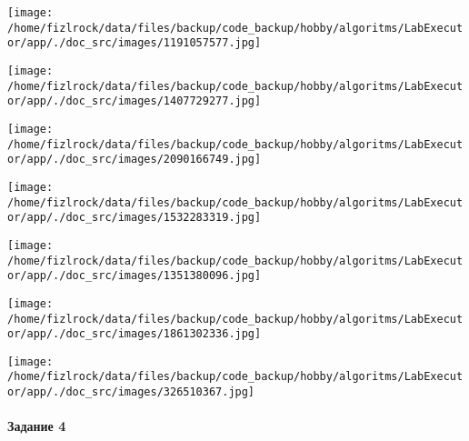 \documentclass[a4paper, 12pt]{article}
\begin{document}
\texttt{[image: /home/fizlrock/data/files/backup/code\_backup/hobby/algoritms/LabExecutor/app/./doc\_src/images/1191057577.jpg]}

\texttt{[image: /home/fizlrock/data/files/backup/code\_backup/hobby/algoritms/LabExecutor/app/./doc\_src/images/1407729277.jpg]}

\texttt{[image: /home/fizlrock/data/files/backup/code\_backup/hobby/algoritms/LabExecutor/app/./doc\_src/images/2090166749.jpg]}

\texttt{[image: /home/fizlrock/data/files/backup/code\_backup/hobby/algoritms/LabExecutor/app/./doc\_src/images/1532283319.jpg]}

\texttt{[image: /home/fizlrock/data/files/backup/code\_backup/hobby/algoritms/LabExecutor/app/./doc\_src/images/1351380096.jpg]}

\texttt{[image: /home/fizlrock/data/files/backup/code\_backup/hobby/algoritms/LabExecutor/app/./doc\_src/images/1861302336.jpg]}

\texttt{[image: /home/fizlrock/data/files/backup/code\_backup/hobby/algoritms/LabExecutor/app/./doc\_src/images/326510367.jpg]}
\pagebreak
\paragraph{Задание 4}
\end{document}
